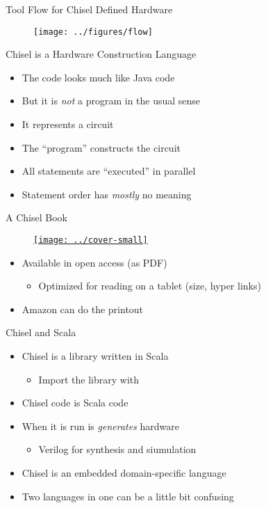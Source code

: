 \begin{frame}[fragile]{Tool Flow for Chisel Defined Hardware}
\begin{figure}
    \centering
    \texttt{[image: ../figures/flow]}
\end{figure}
\end{frame}

\begin{frame}[fragile]{Chisel is a Hardware Construction Language}
\begin{itemize}
\item The code looks much like Java code
\item But it is \emph{not} a program in the usual sense
\item It represents a circuit
\item The ``program'' constructs the circuit
\item All statements are ``executed'' in parallel
\item Statement order has \emph{mostly} no meaning
\end{itemize}
\end{frame}

\begin{frame}[fragile]{A Chisel Book}
\begin{figure}
    \centering
    \href{https://github.com/schoeberl/chisel-book}{\texttt{[image: ../cover-small]}}
\end{figure}

\begin{itemize}
\item Available in open access (as PDF)
\begin{itemize}
\item Optimized for reading on a tablet (size, hyper links)
\end{itemize}
\item Amazon can do the printout
\end{itemize}
\end{frame}



\begin{frame}[fragile]{Chisel and Scala}
\begin{itemize}
\item Chisel is a library written in Scala
\begin{itemize}
\item Import the library with 
\end{itemize}
\item Chisel code is Scala code
\item When it is run is \emph{generates} hardware
\begin{itemize}
\item Verilog for synthesis and siumulation
\end{itemize}
\item Chisel is an embedded domain-specific language
\item Two languages in one can be a little bit confusing
\end{itemize}
\end{frame}


